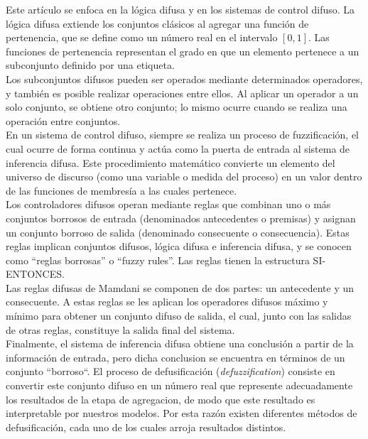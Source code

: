 \documentclass[sigconf, review=false, nonacm]{acmart}
\begin{document}
Este artículo se enfoca en la lógica difusa y en los sistemas de control difuso. La lógica difusa extiende los
conjuntos clásicos al agregar una función de pertenencia, que se define como un número real en el intervalo $
	[0, 1] $. Las funciones de pertenencia representan el grado en que un elemento pertenece a un subconjunto
definido por una etiqueta.\\

Los subconjuntos difusos pueden ser operados mediante determinados operadores, y también es posible realizar
operaciones entre ellos. Al aplicar un operador a un solo conjunto, se obtiene otro conjunto; lo mismo ocurre
cuando se realiza una operación entre conjuntos. \\

En un sistema de control difuso, siempre se realiza un proceso de fuzzificación, el cual ocurre de forma
continua y actúa como la puerta de entrada al sistema de inferencia difusa. Este procedimiento matemático
convierte un elemento del universo de discurso (como una variable o medida del proceso) en un valor dentro de
las funciones de membresía a las cuales pertenece.\\

Los controladores difusos operan mediante reglas que combinan uno o más conjuntos borrosos de entrada
(denominados antecedentes o premisas) y asignan un conjunto borroso de salida (denominado consecuente o
consecuencia). Estas reglas implican conjuntos difusos, lógica difusa e inferencia difusa, y se conocen como
``reglas borrosas'' o ``fuzzy rules''. Las reglas tienen la estructura SI-ENTONCES.\\

Las reglas difusas de Mamdani se componen de dos partes: un antecedente y un consecuente. A estas reglas se
les aplican los operadores difusos máximo y mínimo para obtener un conjunto difuso de salida, el cual, junto
con las salidas de otras reglas, constituye la salida final del sistema.\\

Finalmente, el sistema de inferencia difusa obtiene una conclusión a partir de la información de entrada, pero
dicha conclusion se encuentra en términos de un conjunto ``borroso``. El proceso de defusificación
(\textit{defuzzification}) consiste en convertir este conjunto difuso en un número real que represente
adecuadamente los resultados de la etapa de agregacion, de modo que este resultado es interpretable por
nuestros modelos. Por esta razón existen diferentes métodos de defusificación, cada uno de los cuales arroja
resultados distintos.
\end{document}
